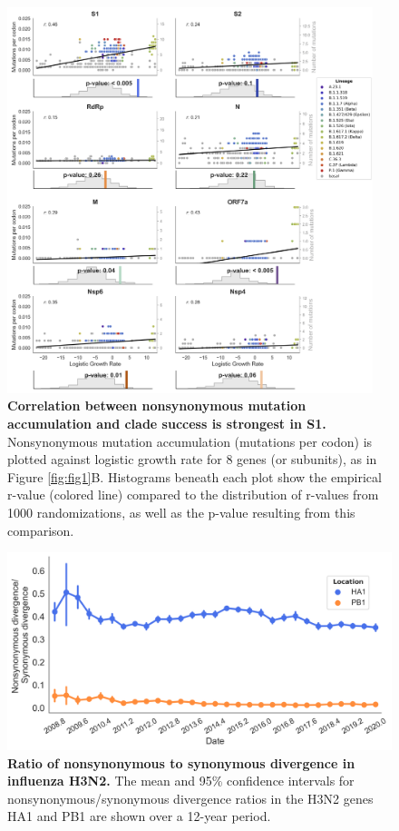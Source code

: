 \documentclass[12pt, letterpaper]{article}
\begin{document}
\begin{figure}[h!]
	\centerline{\includegraphics[width=0.95\textwidth]{fig1_supp3.png}}
	\caption{\textbf{Correlation between nonsynonymous mutation accumulation and clade success is strongest in S1.}
	Nonsynonymous mutation accumulation (mutations per codon) is plotted against logistic growth rate for 8 genes (or subunits), as in Figure \ref{fig:fig1}B. Histograms beneath each plot show the empirical r-value (colored line) compared to the distribution of r-values from 1000 randomizations, as well as the p-value resulting from this comparison.
	}
	\label{fig:fig1_supp3}
\end{figure}

\begin{figure}[h!]
	\centerline{\includegraphics[scale=0.55]{fig2_supp.png}}
	\caption{\textbf{Ratio of nonsynonymous to synonymous divergence in influenza H3N2.}
	The mean and 95\% confidence intervals for nonsynonymous/synonymous divergence ratios in the H3N2 genes HA1 and PB1 are shown over a 12-year period.
	}
	\label{fig:fig2_supp1}
\end{figure}
\end{document}
